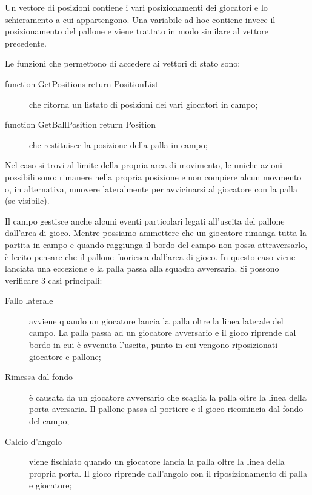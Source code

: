\documentclass[aps,letterpaper,10pt]{article}
\begin{document}
Un vettore di posizioni contiene i vari posizionamenti dei giocatori e lo schieramento a cui appartengono. Una variabile ad-hoc contiene invece il posizionamento del pallone e viene trattato in modo similare al vettore precedente. \vspace{3mm}

Le funzioni che permettono di accedere ai vettori di stato sono:

\begin{description}
	\item[function GetPositions return PositionList] che ritorna un listato di posizioni dei vari giocatori in campo;
	\item[function GetBallPosition return Position] che restituisce la posizione della palla in campo;
\end{description}

Nel caso si trovi al limite della propria area di movimento, le uniche azioni possibili sono: rimanere nella propria posizione e non compiere alcun movmento o, in alternativa, muovere lateralmente per avvicinarsi al giocatore con la palla (se visibile). \vspace{3mm}

Il campo gestisce anche alcuni eventi particolari legati all'uscita del pallone dall'area di gioco. Mentre possiamo ammettere che un giocatore rimanga tutta la partita in campo e quando raggiunga il bordo del campo non possa attraversarlo, \`e lecito pensare che il pallone fuoriesca dall'area di gioco. In questo caso viene lanciata una eccezione e la palla passa alla squadra avversaria. Si possono verificare 3 casi principali:

\begin{description}
	\item[Fallo laterale] avviene quando un giocatore lancia la palla oltre la linea laterale del campo. La palla passa ad un giocatore avversario e il gioco riprende dal bordo in cui \`e avvenuta l'uscita, punto in cui vengono riposizionati giocatore e pallone; 
	\item[Rimessa dal fondo] \`e causata da un giocatore avversario che scaglia la palla oltre la linea della porta aversaria. Il pallone passa al portiere e il gioco ricomincia dal fondo del campo;
	\item[Calcio d'angolo] viene fischiato quando un giocatore lancia la palla oltre la linea della propria porta. Il gioco riprende dall'angolo con il riposizionamento di palla e giocatore;
\end{description}
\end{document}
